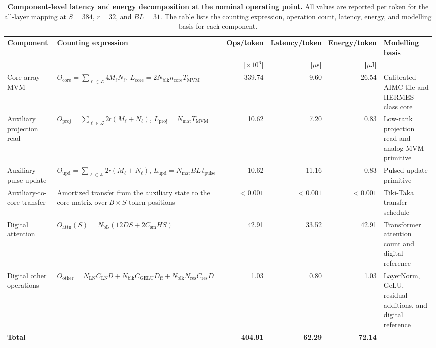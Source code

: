 \documentclass[fleqn,10pt]{wlscirep}
\begin{document}
\begin{table}[!htbp]
\centering
\caption{\textbf{Component-level latency and energy decomposition at the nominal operating point.}
All values are reported per token for the all-layer mapping at \(S=384\), \(r=32\), and \(BL=31\). The table lists the counting expression, operation count, latency, energy, and modelling basis for each component.}
\label{tab:supp_component_decomposition}
{\small
\renewcommand{\arraystretch}{1.18}
\setlength{\tabcolsep}{3.6pt}
\begin{tabularx}{\textwidth}{@{}p{2.9cm}Y r r r p{3.2cm}@{}}
\toprule
\textbf{Component} &
\textbf{Counting expression} &
\textbf{Ops/token} &
\textbf{Latency/token} &
\textbf{Energy/token} &
\textbf{Modelling basis} \\
&
&
\textbf{[\(\times10^{6}\)]} &
\textbf{[\(\mu\mathrm{s}\)]} &
\textbf{[\(\mu\mathrm{J}\)]} &
\\
\midrule
Core-array MVM &
\(O_{\mathrm{core}}=\sum_{\ell\in\mathcal{L}}4M_{\ell}N_{\ell}\), 
\(L_{\mathrm{core}}=2N_{\mathrm{blk}}n_{\mathrm{core}}T_{\mathrm{MVM}}\) &
339.74 & 9.60 & 26.54 &
Calibrated AIMC tile and HERMES-class core \cite{klein2023alpine,khaddam2022hermescore} \\
Auxiliary projection read &
\(O_{\mathrm{proj}}=\sum_{\ell\in\mathcal{L}}2r(M_{\ell}+N_{\ell})\), 
\(L_{\mathrm{proj}}=N_{\mathrm{mat}}T_{\mathrm{MVM}}\) &
10.62 & 7.20 & 0.83 &
Low-rank projection read and analog MVM primitive \cite{hu2021lora,klein2023alpine} \\
Auxiliary pulse update &
\(O_{\mathrm{upd}}=\sum_{\ell\in\mathcal{L}}2r(M_{\ell}+N_{\ell})\), 
\(L_{\mathrm{upd}}=N_{\mathrm{mat}}BL\,t_{\mathrm{pulse}}\) &
10.62 & 11.16 & 0.83 &
Pulsed-update primitive \cite{gokmen2016rpu,rasch2024fastrobust} \\
Auxiliary-to-core transfer &
Amortized transfer from the auxiliary state to the core matrix over \(B\times S\) token positions &
\(<0.001\) & \(<0.001\) & \(<0.001\) &
Tiki-Taka transfer schedule \cite{gokmen2020tikitaka,rasch2024fastrobust} \\
Digital attention &
\(O_{\mathrm{attn}}(S)=N_{\mathrm{blk}}(12DS+2C_{\mathrm{sm}}HS)\) &
42.91 & 33.52 & 42.91 &
Transformer attention count and digital reference \cite{vaswani2017attention,horowitz2014computing} \\
Digital other operations &
\(O_{\mathrm{other}}=N_{\mathrm{LN}}C_{\mathrm{LN}}D+N_{\mathrm{blk}}C_{\mathrm{GELU}}D_{\mathrm{ff}}+N_{\mathrm{blk}}N_{\mathrm{res}}C_{\mathrm{res}}D\) &
1.03 & 0.80 & 1.03 &
LayerNorm, GeLU, residual additions, and digital reference \cite{horowitz2014computing} \\
\midrule
\textbf{Total} &
--- &
\textbf{404.91} & \textbf{62.29} & \textbf{72.14} &
--- \\
\bottomrule
\end{tabularx}
}
\vspace{0.35em}


\end{table}
\end{document}
